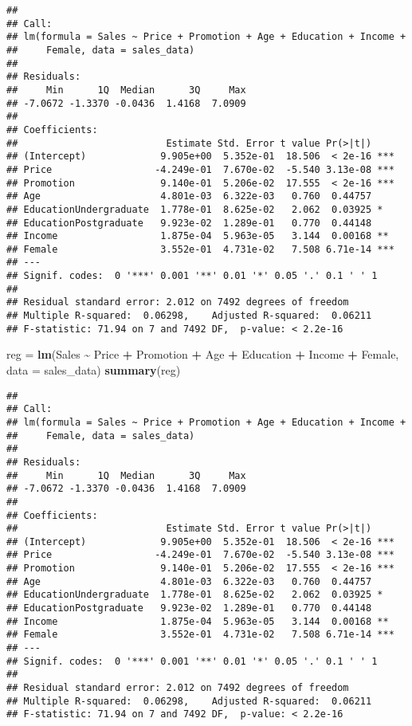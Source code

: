 \documentclass[
]{article}
\newenvironment{Shaded}{\begin{snugshade}}{\end{snugshade}}
\newcommand{\AttributeTok}[1]{\textcolor[rgb]{0.13,0.29,0.53}{#1}}
\newcommand{\FunctionTok}[1]{\textcolor[rgb]{0.13,0.29,0.53}{\textbf{#1}}}
\newcommand{\NormalTok}[1]{#1}
\newcommand{\OtherTok}[1]{\textcolor[rgb]{0.56,0.35,0.01}{#1}}
\newcommand{\SpecialCharTok}[1]{\textcolor[rgb]{0.81,0.36,0.00}{\textbf{#1}}}
\begin{document}
\begin{verbatim}
## 
## Call:
## lm(formula = Sales ~ Price + Promotion + Age + Education + Income + 
##     Female, data = sales_data)
## 
## Residuals:
##     Min      1Q  Median      3Q     Max 
## -7.0672 -1.3370 -0.0436  1.4168  7.0909 
## 
## Coefficients:
##                          Estimate Std. Error t value Pr(>|t|)    
## (Intercept)             9.905e+00  5.352e-01  18.506  < 2e-16 ***
## Price                  -4.249e-01  7.670e-02  -5.540 3.13e-08 ***
## Promotion               9.140e-01  5.206e-02  17.555  < 2e-16 ***
## Age                     4.801e-03  6.322e-03   0.760  0.44757    
## EducationUndergraduate  1.778e-01  8.625e-02   2.062  0.03925 *  
## EducationPostgraduate   9.923e-02  1.289e-01   0.770  0.44148    
## Income                  1.875e-04  5.963e-05   3.144  0.00168 ** 
## Female                  3.552e-01  4.731e-02   7.508 6.71e-14 ***
## ---
## Signif. codes:  0 '***' 0.001 '**' 0.01 '*' 0.05 '.' 0.1 ' ' 1
## 
## Residual standard error: 2.012 on 7492 degrees of freedom
## Multiple R-squared:  0.06298,    Adjusted R-squared:  0.06211 
## F-statistic: 71.94 on 7 and 7492 DF,  p-value: < 2.2e-16
\end{verbatim}

\begin{Shaded}
\begin{Highlighting}[]
\NormalTok{reg }\OtherTok{=} \FunctionTok{lm}\NormalTok{(Sales }\SpecialCharTok{\textasciitilde{}}\NormalTok{ Price }\SpecialCharTok{+}\NormalTok{ Promotion }\SpecialCharTok{+}\NormalTok{ Age }\SpecialCharTok{+}\NormalTok{ Education }\SpecialCharTok{+}\NormalTok{ Income }\SpecialCharTok{+}\NormalTok{ Female, }\AttributeTok{data =}\NormalTok{ sales\_data)}
\FunctionTok{summary}\NormalTok{(reg)}
\end{Highlighting}
\end{Shaded}

\begin{verbatim}
## 
## Call:
## lm(formula = Sales ~ Price + Promotion + Age + Education + Income + 
##     Female, data = sales_data)
## 
## Residuals:
##     Min      1Q  Median      3Q     Max 
## -7.0672 -1.3370 -0.0436  1.4168  7.0909 
## 
## Coefficients:
##                          Estimate Std. Error t value Pr(>|t|)    
## (Intercept)             9.905e+00  5.352e-01  18.506  < 2e-16 ***
## Price                  -4.249e-01  7.670e-02  -5.540 3.13e-08 ***
## Promotion               9.140e-01  5.206e-02  17.555  < 2e-16 ***
## Age                     4.801e-03  6.322e-03   0.760  0.44757    
## EducationUndergraduate  1.778e-01  8.625e-02   2.062  0.03925 *  
## EducationPostgraduate   9.923e-02  1.289e-01   0.770  0.44148    
## Income                  1.875e-04  5.963e-05   3.144  0.00168 ** 
## Female                  3.552e-01  4.731e-02   7.508 6.71e-14 ***
## ---
## Signif. codes:  0 '***' 0.001 '**' 0.01 '*' 0.05 '.' 0.1 ' ' 1
## 
## Residual standard error: 2.012 on 7492 degrees of freedom
## Multiple R-squared:  0.06298,    Adjusted R-squared:  0.06211 
## F-statistic: 71.94 on 7 and 7492 DF,  p-value: < 2.2e-16
\end{verbatim}
\end{document}
